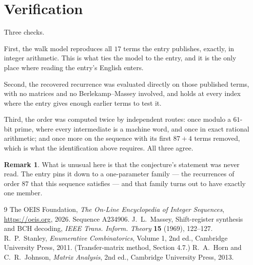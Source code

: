 \documentclass[11pt,a4paper]{article}
\theoremstyle{plain}
\theoremstyle{definition}
\newtheorem{remark}[theorem]{Remark}
\begin{document}
\section{Verification}

Three checks.

First, the walk model reproduces all $17$ terms the entry publishes, exactly, in integer
arithmetic. This is what ties the model to the entry, and it is the only place where reading
the entry's English enters.

Second, the recovered recurrence was evaluated directly on those published terms, with no
matrices and no Berlekamp--Massey involved, and holds at every index where the entry gives
enough earlier terms to test it.

Third, the order was computed twice by independent routes: once modulo a $61$-bit prime, where
every intermediate is a machine word, and once in exact rational arithmetic; and once more on
the sequence with its first $87+4$ terms removed, which is what the identification above
requires. All three agree.

\begin{remark}
What is unusual here is that the conjecture's statement was never read. The entry pins it down
to a one-parameter family --- the recurrences of order $87$ that this sequence satisfies
--- and that family turns out to have exactly one member.
\end{remark}

\begin{thebibliography}{9}
 The OEIS Foundation, \emph{The On-Line Encyclopedia of Integer
Sequences}, \url{https://oeis.org}, 2026. Sequence A234906.
 J.~L.~Massey, Shift-register synthesis and BCH decoding, \emph{IEEE
Trans. Inform. Theory} \textbf{15} (1969), 122--127.
 R.~P.~Stanley, \emph{Enumerative Combinatorics}, Volume 1, 2nd ed.,
Cambridge University Press, 2011. (Transfer-matrix method, Section 4.7.)
 R.~A.~Horn and C.~R.~Johnson, \emph{Matrix Analysis}, 2nd ed., Cambridge
University Press, 2013.
\end{thebibliography}
\end{document}
